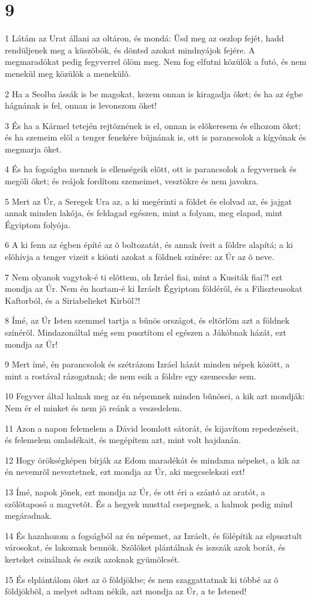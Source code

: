 \chapter{9}

\par 1 Látám az Urat állani az oltáron, és mondá: Üsd meg az oszlop fejét, hadd rendüljenek meg a küszöbök, és döntsd azokat mindnyájok fejére. A megmaradókat pedig fegyverrel ölöm meg. Nem fog elfutni közülök a futó, és nem menekül meg közülök a menekülõ.
\par 2 Ha a Seolba ássák is be magokat, kezem onnan is kiragadja õket; és ha az égbe hágnának is fel, onnan is levonszom õket!
\par 3 És ha a Kármel tetején rejtõznének is el, onnan is elõkeresem és elhozom õket; és ha szemeim elõl a tenger fenekére bújnának is, ott is parancsolok a kígyónak és megmarja õket.
\par 4 És ha fogságba mennek is ellenségeik elõtt, ott is parancsolok a fegyvernek és megöli õket; és reájok fordítom szemeimet, vesztökre és nem javokra.
\par 5 Mert az Úr, a Seregek Ura az, a ki megérinti a földet és elolvad az, és jajgat annak minden lakója, és feldagad egészen, mint a folyam, meg elapad, mint Égyiptom folyója.
\par 6 A ki fenn az égben építé az õ boltozatát, és annak íveit a földre alapítá; a ki elõhívja a tenger  vizeit s kiönti azokat a földnek színére: az Úr az õ neve.
\par 7 Nem olyanok vagytok-é ti elõttem, oh Izráel fiai, mint a Kusiták fiai?! ezt mondja az Úr. Nem én hoztam-é ki Izráelt Égyiptom földérõl, és a Filiszteusokat Kaftorból, és a Siriabelieket Kirbõl?!
\par 8 Ímé, az Úr Isten szemmel tartja a bûnös országot, és eltörlöm azt a földnek színérõl. Mindazonáltal még sem pusztítom el egészen a Jákóbnak házát, ezt mondja az Úr!
\par 9 Mert ímé, én parancsolok és szétrázom Izráel házát minden népek között, a mint a rostával rázogatnak; de nem esik a földre egy szemecske sem.
\par 10 Fegyver által halnak meg az én népemnek minden bûnösei, a kik azt mondják: Nem ér el minket  és nem jõ reánk a veszedelem.
\par 11 Azon a napon felemelem a Dávid leomlott sátorát, és kijavítom repedezéseit, és felemelem omladékait, és megépítem azt, mint volt hajdanán.
\par 12 Hogy örökségképen bírják az Edom maradékát és mindama népeket, a kik az én nevemrõl neveztetnek, ezt mondja az Úr, aki megcselekszi ezt!
\par 13 Ímé, napok jõnek, ezt mondja az Úr, és ott éri a szántó az aratót, a szõlõtaposó a magvetõt. És a hegyek musttal csepegnek,  a halmok pedig mind megáradnak.
\par 14 És hazahozom a fogságból az én népemet, az Izráelt, és fölépítik az elpusztult városokat, és lakoznak bennök. Szõlõket plántálnak és iszszák azok borát, és kerteket csinálnak és eszik azoknak gyümölcsét.
\par 15 És elplántálom õket az õ földjökbe; és nem szaggattatnak ki többé az õ földjökbõl, a melyet adtam nékik, azt mondja az Úr, a te Istened!


